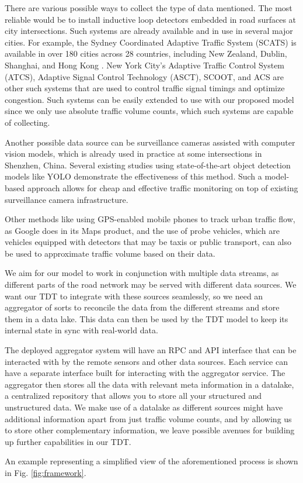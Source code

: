 There are various possible ways to collect the type of data mentioned. The most reliable would be to install inductive loop detectors embedded in road surfaces at city intersections. Such systems are already available and in use in several major cities. For example, the Sydney Coordinated Adaptive Traffic System (SCATS)\cite{scats} is available in over 180 cities across 28 countries, including New Zealand, Dublin, Shanghai, and Hong Kong \cite{wiki:sydney_traffic_system}. New York City's Adaptive Traffic Control System (ATCS), Adaptive Signal Control Technology (ASCT), SCOOT, and ACS are other such systems that are used to control traffic signal timings and optimize congestion. Such systems can be easily extended to use with our proposed model since we only use absolute traffic volume counts, which such systems are capable of collecting.

Another possible data source can be surveillance cameras assisted with computer vision models\cite{jain2019review}, which is already used in practice at some intersections in Shenzhen, China. Several existing studies\cite{asha2018vehicle} using state-of-the-art object detection models like YOLO\cite{redmon2018yolov3} demonstrate the effectiveness of this method. Such a model-based approach allows for cheap and effective traffic monitoring on top of existing surveillance camera infrastructure. 

Other methods like using GPS-enabled mobile phones\cite{rose2006mobile} to track urban traffic flow, as Google does in its Maps product, and the use of probe vehicles\cite{zhu2012probe}, which are vehicles equipped with detectors that may be taxis or public transport, can also be used to approximate traffic volume based on their data.

We aim for our model to work in conjunction with multiple data streams, as different parts of the road network may be served with different data sources. We want our TDT to integrate with these sources seamlessly, so we need an aggregator of sorts to reconcile the data from the different streams and store them in a data lake. This data can then be used by the TDT model to keep its internal state in sync with real-world data.

The deployed aggregator system will have an RPC and API interface that can be interacted with by the remote sensors and other data sources. Each service can have a separate interface built for interacting with the aggregator service. The aggregator then stores all the data with relevant meta information in a datalake, a centralized repository that allows you to store all your structured and unstructured data. We make use of a datalake as different sources might have additional information apart from just traffic volume counts, and by allowing us to store other complementary information, we leave possible avenues for building up further capabilities in our TDT.

An example representing a simplified view of the aforementioned process is shown in Fig. \ref{fig:framework}.